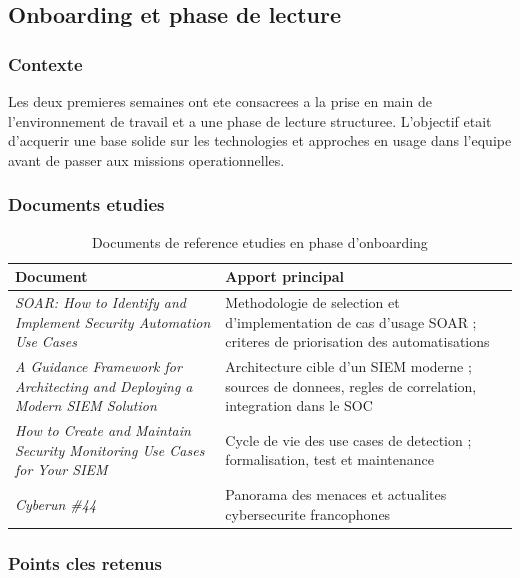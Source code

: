 \documentclass{rapport}
\begin{document}
\subsection{Onboarding et phase de lecture}

\subsubsection{Contexte}

Les deux premieres semaines ont ete consacrees a la prise en main de
l'environnement de travail et a une phase de lecture structuree. L'objectif
etait d'acquerir une base solide sur les technologies et approches en usage
dans l'equipe avant de passer aux missions operationnelles.

\subsubsection{Documents etudies}

\begin{table}[H]
\centering
\begin{tabularx}{\linewidth}{p{6.5cm}X}
\toprule
\textbf{Document} & \textbf{Apport principal} \\
\midrule
\textit{SOAR: How to Identify and Implement Security Automation Use Cases}
  & Methodologie de selection et d'implementation de cas d'usage SOAR ;
    criteres de priorisation des automatisations \\
\addlinespace
\textit{A Guidance Framework for Architecting and Deploying a Modern SIEM Solution}
  & Architecture cible d'un SIEM moderne ; sources de donnees, regles de
    correlation, integration dans le SOC \\
\addlinespace
\textit{How to Create and Maintain Security Monitoring Use Cases for Your SIEM}
  & Cycle de vie des use cases de detection ; formalisation, test et
    maintenance \\
\addlinespace
\textit{Cyberun \#44}
  & Panorama des menaces et actualites cybersecurite francophones \\
\bottomrule
\end{tabularx}
\caption{Documents de reference etudies en phase d'onboarding}
\end{table}

\subsubsection{Points cles retenus}
\end{document}
